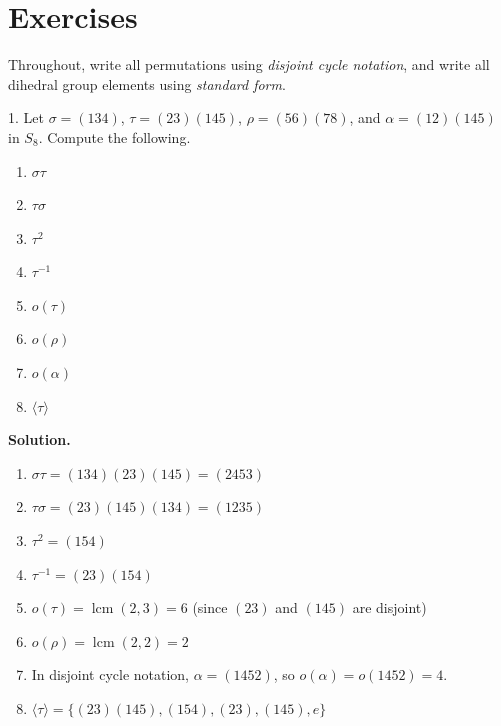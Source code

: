 \documentclass[10pt,]{book}
\theoremstyle{plain}
\theoremstyle{definition}
\theoremstyle{definition}
\theoremstyle{definition}
\theoremstyle{definition}
\numberwithin{equation}{section}
\DeclareMathOperator{\lcm}{lcm}
\begin{document}
\section[{Exercises}]{Exercises}\label{exercises-7}
Throughout, write all permutations using \emph{disjoint cycle notation}, and write all dihedral group elements using \emph{standard form}.%
\begin{exerciselist}
\item[1.]\hypertarget{exercise-41}{}Let \(\sigma=(134)\), \(\tau=(23)(145)\), \(\rho=(56)(78)\), and \(\alpha=(12)(145)\) in \(S_8\). Compute the following. \leavevmode%
\begin{multicols}{4}
\begin{enumerate}[label=(\alph*)]
\item\hypertarget{li-363}{}\(\sigma \tau\)%
\item\hypertarget{li-364}{}\(\tau \sigma\)%
\item\hypertarget{li-365}{}\(\tau^2\)%
\item\hypertarget{li-366}{}\(\tau^{-1}\)%
\item\hypertarget{li-367}{}\(o(\tau)\)%
\item\hypertarget{li-368}{}\(o(\rho)\)%
\item\hypertarget{li-369}{}\(o(\alpha)\)%
\item\hypertarget{li-370}{}\(\langle \tau\rangle\)%
\end{enumerate}
\end{multicols}
%
\par\smallskip
\par\smallskip
\noindent\textbf{Solution.}\hypertarget{solution-41}{}\quad
\leavevmode%
\begin{enumerate}[label=(\alph*)]
\item\hypertarget{li-371}{}\(\sigma \tau= (134)(23)(145)=(2453)\)%
\item\hypertarget{li-372}{}\(\tau \sigma=  (23)(145)(134)=(1235)\)%
\item\hypertarget{li-373}{}\(\tau^2=(154)\)%
\item\hypertarget{li-374}{}\(\tau^{-1}=(23)(154)\)%
\item\hypertarget{li-375}{}\(o(\tau)=\lcm(2,3)=6\) (since \((23)\) and \((145)\) are disjoint)%
\item\hypertarget{li-376}{}\(o(\rho)=\lcm(2,2)=2\)%
\item\hypertarget{li-377}{}In disjoint cycle notation, \(\alpha=(1452)\), so \(o(\alpha)=o(1452)=4\).%
\item\hypertarget{li-378}{}\(\langle \tau\rangle =\{(23)(145), (154), (23), (145), e\}\)%

\end{enumerate}
\end{exerciselist}
\end{document}
